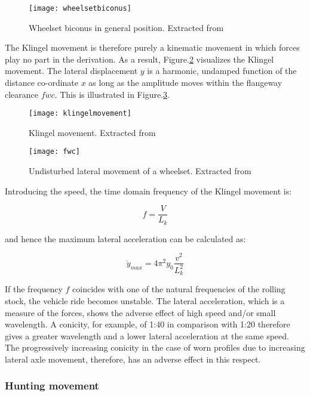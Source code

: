 \begin{figure}[h]
    \centering
    \texttt{[image: wheelsetbiconus]}
    \caption{Wheelset biconus in general position. Extracted from \cite[Figure 2.2]{esveld2001modern}}
    \label{fig:wheelsetbiconus}
\end{figure}


The Klingel movement is therefore purely a kinematic movement in which forces play no part in the derivation. As a result, Figure.\ref{fig:klingelmovement} visualizes the Klingel movement. The lateral displacement $y$ is a harmonic, undamped function of the distance co-ordinate $x$ as long as the amplitude moves within the flangeway clearance $fwc$. This is illustrated in Figure.\ref{fig:fwc}.

\begin{figure}[h]
    \centering
    \texttt{[image: klingelmovement]}
    \caption{Klingel movement. Extracted from \cite[Figure 2.3]{esveld2001modern}}
    \label{fig:klingelmovement}
\end{figure}

\begin{figure}[h]
    \centering
    \texttt{[image: fwc]}
    \caption{Undisturbed lateral movement of a wheelset. Extracted from \cite[Figure 2.4]{esveld2001modern}}
    \label{fig:fwc}
\end{figure}

Introducing the speed, the time domain frequency of the Klingel movement is:

$$ f = \frac{V}{L_k} $$

and hence the maximum lateral acceleration can be calculated as:

$$\ddot{y}_{max} = 4\pi^2y_0\frac{v^2}{L_k^2}$$

If the frequency $f$ coincides with one of the natural frequencies of the rolling stock, the vehicle ride becomes unstable. The lateral acceleration, which is a measure of the forces, shows the adverse effect of high speed and/or small wavelength. A conicity, for example, of 1:40 in comparison with 1:20 therefore gives a greater wavelength and a lower lateral acceleration at the same speed. The progressively increasing conicity in the case of worn profiles due to increasing lateral axle movement, therefore, has an adverse effect in this respect.

\subsubsection{Hunting movement}

